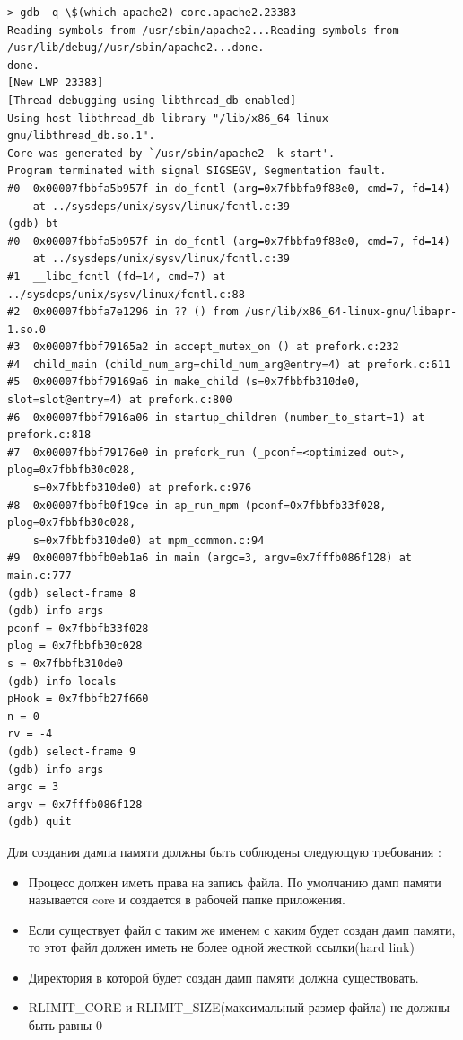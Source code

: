 \documentclass[20pt]{article}
\begin{document}
\begin{lstlisting}
> gdb -q \$(which apache2) core.apache2.23383
Reading symbols from /usr/sbin/apache2...Reading symbols from /usr/lib/debug//usr/sbin/apache2...done.
done.
[New LWP 23383]
[Thread debugging using libthread_db enabled]
Using host libthread_db library "/lib/x86_64-linux-gnu/libthread_db.so.1".
Core was generated by `/usr/sbin/apache2 -k start'.
Program terminated with signal SIGSEGV, Segmentation fault.
#0  0x00007fbbfa5b957f in do_fcntl (arg=0x7fbbfa9f88e0, cmd=7, fd=14)
    at ../sysdeps/unix/sysv/linux/fcntl.c:39
(gdb) bt
#0  0x00007fbbfa5b957f in do_fcntl (arg=0x7fbbfa9f88e0, cmd=7, fd=14)
    at ../sysdeps/unix/sysv/linux/fcntl.c:39
#1  __libc_fcntl (fd=14, cmd=7) at ../sysdeps/unix/sysv/linux/fcntl.c:88
#2  0x00007fbbfa7e1296 in ?? () from /usr/lib/x86_64-linux-gnu/libapr-1.so.0
#3  0x00007fbbf79165a2 in accept_mutex_on () at prefork.c:232
#4  child_main (child_num_arg=child_num_arg@entry=4) at prefork.c:611
#5  0x00007fbbf79169a6 in make_child (s=0x7fbbfb310de0, slot=slot@entry=4) at prefork.c:800
#6  0x00007fbbf7916a06 in startup_children (number_to_start=1) at prefork.c:818
#7  0x00007fbbf79176e0 in prefork_run (_pconf=<optimized out>, plog=0x7fbbfb30c028,
    s=0x7fbbfb310de0) at prefork.c:976
#8  0x00007fbbfb0f19ce in ap_run_mpm (pconf=0x7fbbfb33f028, plog=0x7fbbfb30c028,
    s=0x7fbbfb310de0) at mpm_common.c:94
#9  0x00007fbbfb0eb1a6 in main (argc=3, argv=0x7fffb086f128) at main.c:777
(gdb) select-frame 8
(gdb) info args
pconf = 0x7fbbfb33f028
plog = 0x7fbbfb30c028
s = 0x7fbbfb310de0
(gdb) info locals
pHook = 0x7fbbfb27f660
n = 0
rv = -4
(gdb) select-frame 9
(gdb) info args
argc = 3
argv = 0x7fffb086f128
(gdb) quit
\end{lstlisting}

Для создания дампа памяти должны быть соблюдены следующую требования \cite{man/coredump}:
\begin{itemize}
  \item Процесс должен иметь права на запись файла. По умолчанию дамп памяти
  называется core и создается в рабочей папке приложения.
  \item Если существует файл с таким же именем с каким будет создан дамп памяти,
  то этот файл должен иметь не более одной жесткой ссылки(hard link)
  \item Директория в которой будет создан дамп памяти должна существовать.
  \item RLIMIT\_CORE и RLIMIT\_SIZE(максимальный размер файла) не должны быть равны 0
\end{itemize}
\end{document}
